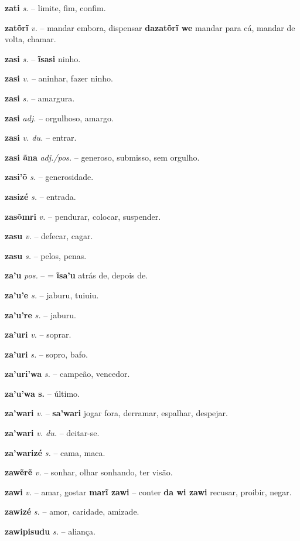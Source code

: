 \textbf{zati} \textit{s.} -- limite, fim, confim.

\textbf{zatõrĩ} \textit{v.} -- mandar embora, dispensar  \textbf{dazatõrĩ we} mandar para cá, mandar de volta, chamar.

\textbf{zasi} \textit{s.} -- \textbf{ĩsasi} ninho.

\textbf{zasi} \textit{v.} -- aninhar, fazer ninho.

\textbf{zasi} \textit{s.} -- amargura.

\textbf{zasi} \textit{adj.} -- orgulhoso, amargo.

\textbf{zasi} \textit{v. du.} -- entrar.

\textbf{zasi ãna} \textit{adj./pos.} -- generoso, submisso, sem orgulho.

\textbf{zasi'õ} \textit{s.} -- generosidade.

\textbf{zasizé} \textit{s.} -- entrada.

\textbf{zasõmri} \textit{v.} -- pendurar, colocar, suspender.

\textbf{zasu} \textit{v.} -- defecar, cagar.

\textbf{zasu} \textit{s.} -- pelos, penas.

\textbf{za'u} \textit{pos.} -- = \textbf{ĩsa'u} atrás de, depois de.

\textbf{za'u'e} \textit{s.} -- jaburu, tuiuiu.

\textbf{za'u're} \textit{s.} -- jaburu.

\textbf{za'uri} \textit{v.} -- soprar.

\textbf{za'uri} \textit{s.} -- sopro, bafo.

\textbf{za'uri'wa} \textit{s.} -- campeão, vencedor.

\textbf{za'u'wa s.} -- último.

\textbf{za'wari} \textit{v.} -- \textbf{sa'wari} jogar fora, derramar, espalhar, despejar.

\textbf{za'wari} \textit{v. du.} -- deitar-se.

\textbf{za'warizé} \textit{s.} -- cama, maca.

\textbf{zawẽrẽ} \textit{v.} -- sonhar, olhar sonhando, ter visão.

\textbf{zawi} \textit{v.} -- amar, gostar  \textbf{marĩ zawi} -- conter  \textbf{da wi zawi} recusar, proibir, negar.

\textbf{zawizé} \textit{s.} -- amor, caridade, amizade.

\textbf{zawipisudu} \textit{s.} -- aliança.

